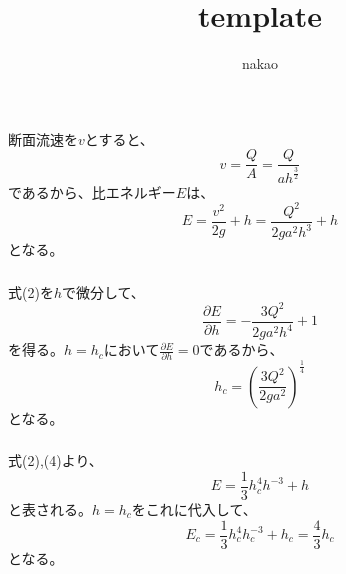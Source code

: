 \documentclass[a4paper]{jsarticle}
\begin{document}
\title{template}
\author{nakao}
\maketitle

\section{}
\subsection{}
\subsubsection{}
断面流速を$v$とすると、
\begin{equation}
  v = \frac{Q}{A} = \frac{Q}{a h^{\frac{3}{2}}}
\end{equation}
であるから、比エネルギー$E$は、
\begin{equation}
  E = \frac{v^2}{2g} + h = \frac{Q^2}{2g a^2 h^3} + h
\end{equation}
となる。

\subsubsection{}
式(2)を$h$で微分して、
\begin{equation}
  \frac{\partial E}{\partial h} = -\frac{3 Q^2}{2g a^2 h^4} + 1
\end{equation}
を得る。$h = h_c$において$\frac{\partial E}{\partial h} = 0$であるから、
\begin{equation}
  h_c = \left(\frac{3 Q^2}{2 g a^2}\right)^{\frac{1}{4}}
\end{equation}
となる。

\subsubsection{}
式(2),(4)より、
\begin{equation}
  E = \frac{1}{3} h_c^4 h^{-3} + h
\end{equation}
と表される。$h = h_c$をこれに代入して、
\begin{equation}
  E_c = \frac{1}{3} h_c^4 h_c^{-3} + h_c = \frac{4}{3} h_c
\end{equation}
となる。
\end{document}
